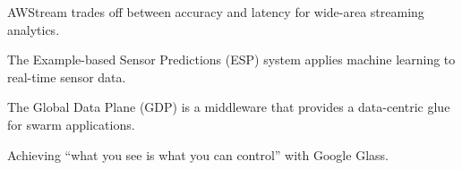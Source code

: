 
\begin{cvskills}

   {AWStream trades off between accuracy and latency for
    wide-area streaming analytics.}

   {The Example-based Sensor Predictions (ESP) system applies
    machine learning to real-time sensor data.}

   {The Global Data Plane (GDP) is a middleware that provides a
    data-centric glue for swarm applications.}

   {Achieving ``what you see is what you can control'' with
    Google Glass.}

\end{cvskills}

